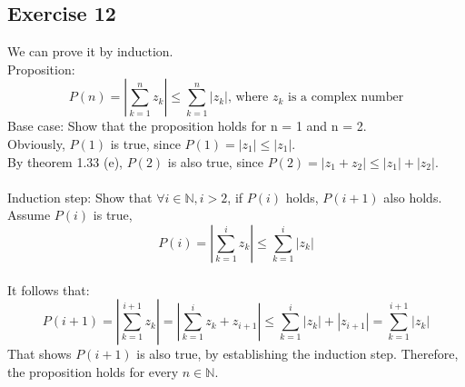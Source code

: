 \subsection*{Exercise 12}
We can prove it by induction. \\
Proposition:
\[P(n) = |\sum_{k = 1}^{n} z_{k}| \le \sum_{k=1}^{n}|z_{k}| \text{, where $z_{k}$ is a complex number}\]
Base case: Show that the proposition holds for n = 1 and n = 2. \\

Obviously, $P(1)$ is true, since $P(1) = |z_{1}| \le |z_{1}|$. \\ 

By theorem 1.33 (e), $P(2)$ is also true, since $P(2) = |z_{1} + z_{2}| \le |z_{1}| + |z_{2}|$. \\ \\
Induction step: Show that $\forall i \in \mathbb{N}, i > 2$, if $P(i)$ holds, $P(i + 1)$ also holds. \\

Assume $P(i)$ is true, \[P(i) = |\sum_{k = 1}^{i} z_{k}| \le \sum_{k=1}^{i}|z_{k}|\] \\

It follows that: \[P(i + 1) = |\sum_{k = 1}^{i + 1} z_{k}| = |\sum_{k = 1}^{i} z_{k} + z_{i+1}| \le \sum_{k=1}^{i}|z_{k}| + |z_{i + 1}| = \sum_{k=1}^{i + 1}|z_{k}|\]
That shows $P(i + 1)$ is also true, by establishing the induction step.
Therefore, the proposition holds for every $n \in \mathbb{N}$.

